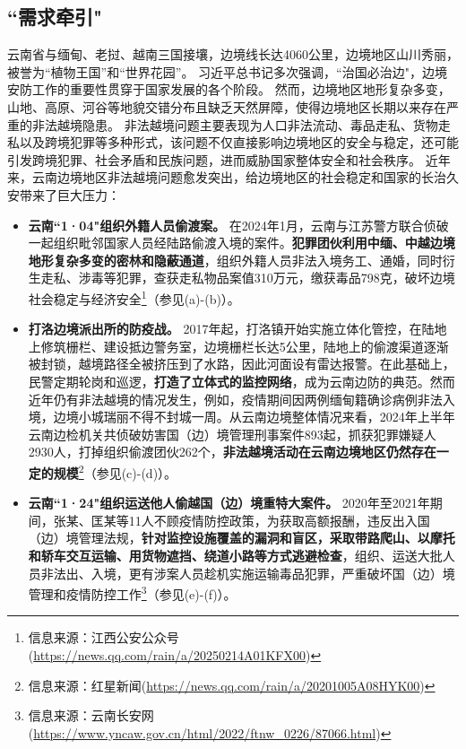 \subsection{``需求牵引"}

云南省与缅甸、老挝、越南三国接壤，边境线长达4060公里，边境地区山川秀丽，被誉为“植物王国”和“世界花园”。
习近平总书记多次强调，``治国必治边"，边境安防工作的重要性贯穿于国家发展的各个阶段。
然而，边境地区地形复杂多变，山地、高原、河谷等地貌交错分布且缺乏天然屏障，使得边境地区长期以来存在严重的非法越境隐患。
非法越境问题主要表现为人口非法流动、毒品走私、货物走私以及跨境犯罪等多种形式，该问题不仅直接影响边境地区的安全与稳定，还可能引发跨境犯罪、社会矛盾和民族问题，进而威胁国家整体安全和社会秩序。
近年来，云南边境地区非法越境问题愈发突出，给边境地区的社会稳定和国家的长治久安带来了巨大压力：

\begin{itemize}[left=15pt,itemsep=1em,label={\textasteriskcentered}]
\item \textbf{云南``1·04"组织外籍人员偷渡案。} 在2024年1月，云南与江苏警方联合侦破一起组织毗邻国家人员经陆路偷渡入境的案件。\textbf{犯罪团伙利用中缅、中越边境地形复杂多变的密林和隐蔽通道}，组织外籍人员非法入境务工、通婚，同时衍生走私、涉毒等犯罪，查获走私物品案值310万元，缴获毒品798克，破坏边境社会稳定与经济安全\footnote{信息来源：江西公安公众号(\url{https://news.qq.com/rain/a/20250214A01KFX00})}（参见(a)-(b)）。
\item \textbf{打洛边境派出所的防疫战。} 2017年起，打洛镇开始实施立体化管控，在陆地上修筑栅栏、建设抵边警务室，边境栅栏长达5公里，陆地上的偷渡渠道逐渐被封锁，越境路径全被挤压到了水路，因此河面设有雷达报警。在此基础上，民警定期轮岗和巡逻，\textbf{打造了立体式的监控网络}，成为云南边防的典范。然而近年仍有非法越境的情况发生，例如，疫情期间因两例缅甸籍确诊病例非法入境，边境小城瑞丽不得不封城一周。从云南边境整体情况来看，2024年上半年云南边检机关共侦破妨害国（边）境管理刑事案件893起，抓获犯罪嫌疑人2930人，打掉组织偷渡团伙262个，\textbf{非法越境活动在云南边境地区仍然存在一定的规模}\footnote{信息来源：红星新闻(\url{https://news.qq.com/rain/a/20201005A08HYK00})}（参见(c)-(d)）。
\item \textbf{云南``1·24"组织运送他人偷越国（边）境重特大案件。} 2020年至2021年期间，张某、匡某等11人不顾疫情防控政策，为获取高额报酬，违反出入国（边）境管理法规，\textbf{针对监控设施覆盖的漏洞和盲区，采取带路爬山、以摩托和轿车交互运输、用货物遮挡、绕道小路等方式逃避检查}，组织、运送大批人员非法出、入境，更有涉案人员趁机实施运输毒品犯罪，严重破坏国（边）境管理和疫情防控工作\footnote{信息来源：云南长安网(\url{https://www.yncaw.gov.cn/html/2022/ftnw_0226/87066.html})}（参见(e)-(f)）。
\end{itemize}

